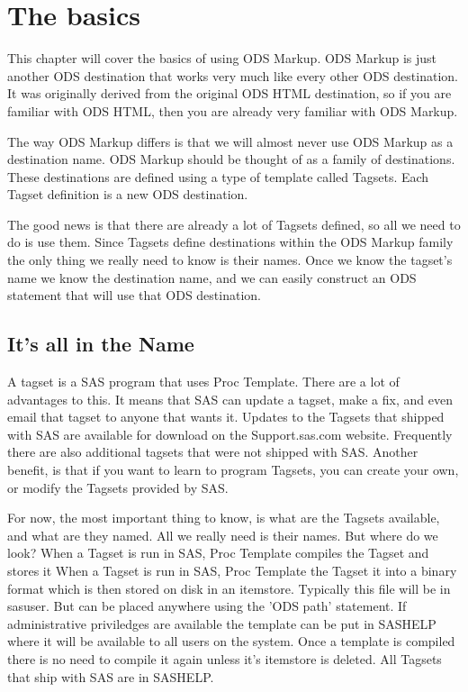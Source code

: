 \chapter{The basics}
This chapter will cover the basics of using ODS Markup.
ODS Markup is just another ODS destination that works very much
like every other ODS destination.  It was originally derived from
the original ODS HTML destination, so if you are familiar with ODS HTML,
then you are already very familiar with ODS Markup.

The way ODS Markup differs is that we will almost never use ODS Markup as
a destination name.  ODS Markup should be thought of as a family of destinations.
These destinations are defined using a type of template called Tagsets.  Each
Tagset definition is a new ODS destination.
 
The good news is that there are already a lot of Tagsets defined, so all we need
to do is use them.  Since Tagsets define destinations within the ODS Markup family
the only thing we really need to know is their names.  Once we know the tagset's 
name we know the destination name, and we can easily construct an ODS statement
that will use that ODS destination.

\section{It's all in the Name}
A tagset is a SAS program that uses Proc Template.  There are a lot of advantages to
this.  It means that SAS can update a tagset, make a fix, and even email that tagset
to anyone that wants it.  Updates to the Tagsets that shipped with SAS are available
for download on the Support.sas.com website.  Frequently there are also additional 
tagsets that were not shipped with SAS.  Another benefit, is that if you want to learn
to program Tagsets, you can create your own, or modify the Tagsets provided by SAS.

For now, the most important thing to know, is what are the Tagsets available, and 
what are they named.  All we really need is their names.  But where do we look?
When a Tagset is run in SAS, Proc Template compiles the Tagset and stores it
When a Tagset is run in SAS, Proc Template the Tagset
it into a binary format which is then stored on disk in an itemstore.
Typically this file will be in sasuser.  But can be placed anywhere
using the 'ODS path' statement.  If administrative priviledges are
available the template can be put in SASHELP where it will be
available to all users on the system.  Once a template is compiled
there is no need to compile it again unless it's itemstore is
deleted.  All Tagsets that ship with SAS are in SASHELP.

